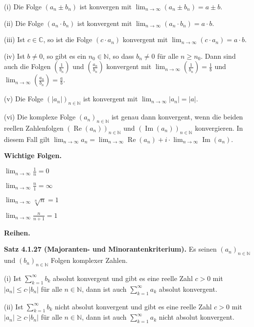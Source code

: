 \documentclass[ngerman]{article}
\begin{document}
\begin{multicols}{4}
\begin{tiny}
(i) Die Folge $(a_n \pm b_n)$ ist konvergen mit $\lim_{n \rightarrow \infty} (a_n \pm b_n) = a \pm b$.

(ii) Die Folge $(a_n \cdot b_n)$ ist konvergent mit $\lim_{n \rightarrow \infty} (a_n \cdot b_n) = a \cdot b$.

(iii) Ist $c \in \mathbb C$, so ist die Folge $(c \cdot a_n)$ konvergent mit $\lim_{n \rightarrow \infty} (c \cdot a_n ) = a \cdot b$.

(iv) Ist $b \neq 0$, so gibt es ein $n_0 \in \mathbb N$, so dass $b_n \neq 0$ für alle $n \geq n_0$. Dann sind auch die Folgen $(\frac{1}{b_n})$ und $(\frac{a_n}{b_n})$ konvergent mit $\lim_{n\rightarrow \infty } (\frac{1}{b_n}) = \frac{1}{b}$ und $\lim_{n\rightarrow \infty } (\frac{a_n}{b_n}) = \frac{a}{b}$.

(v) Die Folge $(\vert a_n \vert )_{n \in \mathbb N}$ ist konvergent mit $\lim_{n \rightarrow \infty } \vert a_n \vert = \vert a \vert$.

(vi) Die komplexe Folge $(a_n)_{n \in \mathbb N}$ ist genau dann konvergent, wenn die beiden reellen Zahlenfolgen $(\operatorname{Re} (a_n))_{n \in \mathbb N}$ und $(\operatorname{Im} (a_n))_{n \in \mathbb N}$ konvergieren. In diesem Fall gilt $\lim_{n \rightarrow \infty} a_n = \lim_{n \rightarrow \infty} \operatorname{Re} (a_n) + i \cdot \lim_{n \rightarrow \infty} \operatorname{Im} (a_n)$.

\textbf{Wichtige Folgen.}

$\lim_{n \rightarrow \infty} \frac{1}{n} = 0$

$\lim_{n \rightarrow \infty} \frac{n}{1} = \infty$

$\lim_{n \rightarrow \infty} \sqrt[n]{n} = 1$

$\lim_{n \rightarrow \infty} \frac{n}{n+1} = 1$

\textbf{Reihen.}

\textbf{Satz 4.1.27 (Majoranten- und Minorantenkriterium).} Es seinen $(a_n)_{n \in \mathbb N}$ und $(b_n)_{n \in \mathbb N}$ Folgen komplexer Zahlen.

(i) Ist $\sum_{k=1}^\infty b_k$ absolut konvergent und gibt es eine reelle Zahl $c > 0$ mit $\vert a_n\vert \leq c \cdot \vert b_n \vert$ für alle $n \in \mathbb N$, dann ist auch $\sum_{k=1}^\infty a_k$ absolut konvergent.

(ii) Ist $\sum_{k=1}^\infty b_k$ nicht absolut konvergent und gibt es eine reelle Zahl $c > 0$ mit $\vert a_n\vert \geq c \cdot \vert b_n \vert$ für alle $n \in \mathbb N$, dann ist auch $\sum_{k=1}^\infty a_k$ nicht absolut konvergent.


\end{tiny}
\end{multicols}
\end{document}
